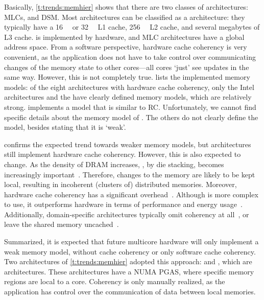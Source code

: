 Basically, \cref{t:trends:memhier} shows that there are two classes of architectures: \aclp{MLC}, and \acl{DSM}.
Most architectures can be classified as a  architecture: they typically have a \SI{16}{\Kilo\byte} or \SI{32}{\Kilo\byte} L1 cache, \SI{256}{\Kilo\byte} L2 cache, and several megabytes of L3 cache.
 is implemented by hardware, and \ac{MLC} architectures have a global address space.
From a software perspective, hardware cache coherency is very convenient, as the application does not have to take control over communicating changes of the memory state to other cores---all cores `just' see updates in the same way.
However, this is not completely true.
 lists the implemented memory models: of the eight architectures with hardware cache coherency, only the Intel architectures and the \UltraSPARC have clearly defined memory models, which are relatively strong.
\POWERseven implements a model that is similar to \acl{RC}.
Unfortunately, we cannot find specific details about the memory model of \Freescale.
The others do not clearly define the model, besides stating that it is `weak'.

 confirms the expected trend towards weaker memory models, but architectures still implement hardware cache coherency.
However, this is also expected to change.
As the density of \ac{DRAM} increases, \eg, by  die stacking,  becomes increasingly important~\cite{borkar:future}.
Therefore, changes to the memory are likely to be kept local, resulting in incoherent (clusters of) distributed memories.
Moreover, hardware cache coherency has a significant overhead~\cite{choi:denovo}.
Although  is more complex to use, it outperforms hardware in terms of performance and energy usage~\cite{adve:hwsw_cache_coherency}.
Additionally, domain-specific architectures typically omit coherency at all~\cite{blake:multiproc_survey}, or leave the shared memory uncached~\cite{petrot:memory_consistency_in_noc}.


Summarized, it is expected that future multicore hardware will only implement a weak memory model, without cache coherency or only software cache coherency.
Two architectures of \vref{t:trends:memhier} adopted this approach: \IntelSCC and \Epiphany, which are  architectures.
These architectures have a \ac{NUMA} \acl{PGAS}, where specific memory regions are local to a core.
Coherency is only manually realized, as the application has control over the communication of data between local memories.

